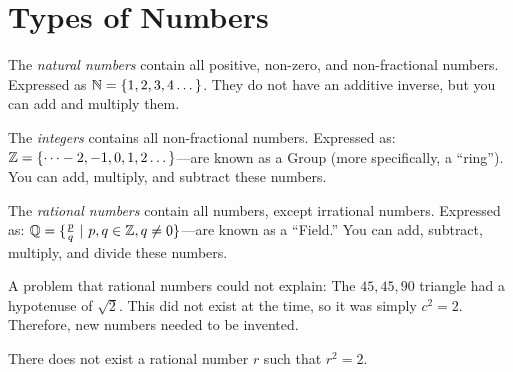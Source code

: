 \renewcommand{\theenumi}{\arabic{enumi}}
\renewcommand{\labelenumi}{\theenumi.}
\section{Types of Numbers}

\begin{definition}
    
The \textit{natural numbers} contain all positive, non-zero, and non-fractional numbers. Expressed as \(\mathbb{N} = \{1,2,3,4\dots\}\). They do not have an additive inverse, but you can add and multiply them.
\end{definition}

\begin{definition}
    
The \textit{integers} contains all non-fractional numbers. Expressed as: \(\mathbb{Z} = \{\dots-2,-1,0,1,2\dots\}\)---are known as a Group (more specifically, a ``ring''). You can add, multiply, and subtract these numbers.
\end{definition}

\begin{definition}
    
The \textit{rational numbers} contain all numbers, except irrational numbers. Expressed as: \(\mathbb{Q} = \{\frac{p}{q} \ | \ p,q \in \mathbb{Z}, q \ne 0\}\)---are known as a ``Field.'' You can add, subtract, multiply, and divide these numbers.

\end{definition}

A problem that rational numbers could not explain: The \(45, 45, 90\) triangle had a hypotenuse of \(\sqrt{2}\). This did not exist at the time, so it was simply \(c^2 = 2\). Therefore, new numbers needed to be invented.

\begin{theorem}
    There does not exist a rational number \(r\) such that \(r^2 = 2\).
\end{theorem}


